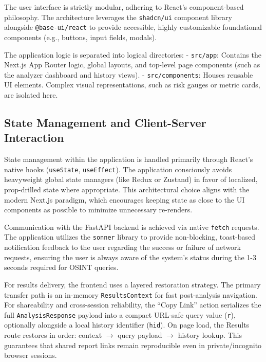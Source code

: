 The user interface is strictly modular, adhering to React's
component-based philosophy. The architecture leverages the
\texttt{shadcn/ui} component library alongside \texttt{@base-ui/react}
to provide accessible, highly customizable foundational components
(e.g., buttons, input fields, modals).

The application logic is separated into logical directories: -
\texttt{src/app}: Contains the Next.js App Router logic, global layouts,
and top-level page components (such as the analyzer dashboard and
history views). - \texttt{src/components}: Houses reusable UI elements.
Complex visual representations, such as risk gauges or metric cards, are
isolated here.

\subsection{State Management and Client-Server
Interaction}\label{state-management-and-client-server-interaction}

State management within the application is handled primarily through
React's native hooks (\texttt{useState}, \texttt{useEffect}). The
application consciously avoids heavyweight global state managers (like
Redux or Zustand) in favor of localized, prop-drilled state where
appropriate. This architectural choice aligns with the modern Next.js
paradigm, which encourages keeping state as close to the UI components
as possible to minimize unnecessary re-renders.

Communication with the FastAPI backend is achieved via native
\texttt{fetch} requests. The application utilizes the \texttt{sonner}
library to provide non-blocking, toast-based notification feedback to
the user regarding the success or failure of network requests, ensuring
the user is always aware of the system's status during the 1-3 seconds
required for OSINT queries.

For results delivery, the frontend uses a layered restoration strategy.
The primary transfer path is an in-memory \texttt{ResultsContext} for
fast post-analysis navigation. For shareability and cross-session
reliability, the ``Copy Link'' action serializes the full
\texttt{AnalysisResponse} payload into a compact URL-safe query value
(\texttt{r}), optionally alongside a local history identifier
(\texttt{hid}). On page load, the Results route restores in order:
context \(\rightarrow\) query payload \(\rightarrow\) history lookup.
This guarantees that shared report links remain reproducible even in
private/incognito browser sessions.

